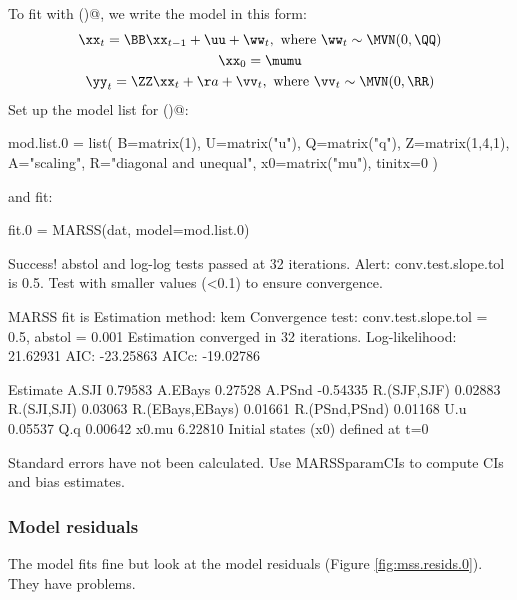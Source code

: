 To fit with \verb@MARSS()@, we write the model in this form:
\begin{equation}
\begin{gathered}
\xx_t = \BB \xx_{t-1} + \uu + \ww_t, \textrm{ where } \ww_t \sim \MVN(0,\QQ ) \\
\xx_0 = \mumu \\
\yy_t = \ZZ \xx_t + \aa + \vv_t, \textrm{ where } \vv_t \sim \MVN(0,\RR )
\end{gathered}
\end{equation}
Set up the model list for \verb@MARSS()@:
\begin{Schunk}
\begin{Sinput}
 mod.list.0 = list(
 B=matrix(1),
 U=matrix("u"),
 Q=matrix("q"),
 Z=matrix(1,4,1),
 A="scaling",
 R="diagonal and unequal",
 x0=matrix("mu"),
 tinitx=0 )
\end{Sinput}
\end{Schunk}
and fit:
\begin{Schunk}
\begin{Sinput}
 fit.0 = MARSS(dat, model=mod.list.0)
\end{Sinput}
\begin{Soutput}
Success! abstol and log-log tests passed at 32 iterations.
Alert: conv.test.slope.tol is 0.5.
Test with smaller values (<0.1) to ensure convergence.

MARSS fit is
Estimation method: kem 
Convergence test: conv.test.slope.tol = 0.5, abstol = 0.001
Estimation converged in 32 iterations. 
Log-likelihood: 21.62931 
AIC: -23.25863   AICc: -19.02786   
 
                Estimate
A.SJI            0.79583
A.EBays          0.27528
A.PSnd          -0.54335
R.(SJF,SJF)      0.02883
R.(SJI,SJI)      0.03063
R.(EBays,EBays)  0.01661
R.(PSnd,PSnd)    0.01168
U.u              0.05537
Q.q              0.00642
x0.mu            6.22810
Initial states (x0) defined at t=0

Standard errors have not been calculated. 
Use MARSSparamCIs to compute CIs and bias estimates.
\end{Soutput}
\end{Schunk}

\subsubsection{Model residuals}

The model fits fine but look at the model residuals (Figure \ref{fig:mss.resids.0}).  They have problems.
\begin{Schunk}
\end{Schunk}

